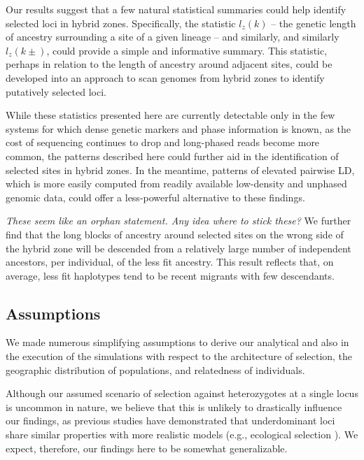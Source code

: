 \documentclass[11pt,letterpaper]{article}
\newcommand{\alisa}[1]{{\em \color{red} #1}}
\begin{document}
Our results suggest that a few natural statistical summaries could help identify selected loci in hybrid zones. 
Specifically, the statistic $l_z(k)$ -- the genetic length of ancestry surrounding a site of a given lineage -- and similarly,  and similarly $l_z(k\pm)$, could provide a simple and informative summary. 
This statistic, perhaps in relation to the length of ancestry around adjacent sites, could be developed into an approach to scan genomes from hybrid zones to identify putatively selected loci. 

While these statistics presented here are currently detectable only in the few systems for which dense genetic markers and phase information is known, as the cost of sequencing continues to drop and long-phased reads become more common, the patterns described here could further aid in the identification of selected sites in hybrid zones. In the meantime, patterns of elevated pairwise LD, which is more easily computed from readily available low-density and unphased genomic data, could offer a less-powerful alternative to these findings. 



\alisa{These seem like an orphan statement. Any idea where to stick these?}
We further find that the long blocks of ancestry around selected sites on the wrong side of the hybrid zone will be descended from a relatively large number of independent ancestors, per individual, of the less fit ancestry. This result reflects that, on average, less fit haplotypes tend to be recent migrants with few descendants.  



\subsection*{Assumptions}

We made numerous simplifying assumptions to derive our analytical and also in the execution of the simulations with respect to the architecture of selection, the geographic distribution of populations, and relatedness of individuals.

Although our assumed scenario of selection against heterozygotes at a single locus is uncommon in nature, we believe that this is unlikely to drastically influence our findings, as previous studies have demonstrated that underdominant loci share similar properties with more realistic models (e.g., ecological selection \citep{Barton1989,Barton1993}). 
We expect, therefore, our findings here to be somewhat generalizable. 
\end{document}
